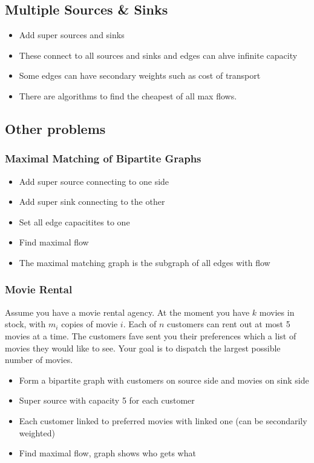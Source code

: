 \documentclass[a4paper]{article}
\begin{document}
\subsection{Multiple Sources \& Sinks}
		 \begin{itemize}
				 \item Add super sources and sinks
				 \item These connect to all sources and sinks and edges can ahve infinite capacity
				 \item Some edges can have secondary weights such as cost of transport
				 \item There are algorithms to find the cheapest of all max flows.
		 \end{itemize}
\subsection{Other problems}
\subsubsection{Maximal Matching of Bipartite Graphs}
\begin{itemize}
		\item Add super source connecting to one side
		\item Add super sink connecting to the other
		\item Set all edge capacitites to one
		\item Find maximal flow
		\item The maximal matching graph is the subgraph of all edges with flow
\end{itemize}
\subsubsection{Movie Rental}
Assume you have a movie rental agency. At the moment you have $k$
movies in stock, with $m_i$ copies of movie $i$. Each of $n$ customers can rent
out at most 5 movies at a time. The customers fave sent you their
preferences which a list of movies they would like to see. Your goal is to
dispatch the largest possible number of movies.
\begin{itemize}
		\item Form a bipartite graph with customers on source side and movies on sink side
		\item Super source with capacity 5 for each customer
		\item Each customer linked to preferred movies with linked one (can be secondarily weighted)
		\item Find maximal flow, graph shows who gets what
\end{itemize}
\end{document}
